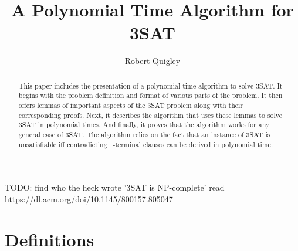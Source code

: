 \documentclass[manuscript]{acmart}
\begin{document}
    \title{A Polynomial Time Algorithm for 3SAT} %
    \author{Robert Quigley}
    
    \begin{abstract}
        This paper includes the presentation of a polynomial time algorithm to
        solve 3SAT. It begins with the problem definition and format of various
        parts of the problem. It then offers lemmas of important aspects of 
        the 3SAT problem along with their corresponding proofs. Next, it describes
        the algorithm that uses these lemmas to solve 3SAT in polynomial times. And finally, it proves
        that the algorithm works for any general case of 3SAT. The algorithm relies
        on the fact that an instance of 3SAT is unsatisfiable iff contradicting
        1-terminal clauses can be derived in polynomial time.
    \end{abstract}
    
    
    \maketitle 

    
    TODO: find who the heck wrote '3SAT is NP-complete'
    read https://dl.acm.org/doi/10.1145/800157.805047
    
    \section{Definitions}
\end{document}
